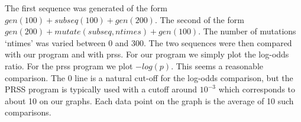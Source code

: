 \documentclass[a4paper,10pt,oneside]{article}
\begin{document}
The first sequence was generated of the form $gen(100) + subseq(100) +
gen(200)$.  The second of the form $gen(200) + mutate(subseq, ntimes) +
gen(100)$.  The number of mutations `ntimes' was varied between 0 and 300.
The two sequences were then compared with our program and with prss.  For our
program we simply plot the log-odds ratio.  For the prss program we plot
$-log(p)$.  This seems a reasonable comparison.  The 0 line is a natural
cut-off for the log-odds comparison, but the PRSS program is typically used
with a cutoff around $10^{-3}$ which corresponds to about 10 on our graphs.
Each data point on the graph is the average of 10 such comparisons.

\begin{figure}[htb]
\centerline{}
\end{figure}

\begin{figure}[htb]
\centerline{}
\end{figure}

\begin{figure}[htb]
\centerline{}
\end{figure}

\begin{figure}[htb]
\centerline{}
\end{figure}
\end{document}
